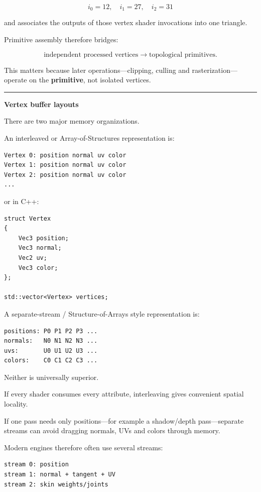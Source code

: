 \[
i_0=12,\quad i_1=27,\quad i_2=31
\]

and associates the outputs of those vertex shader invocations into one triangle.

Primitive assembly therefore bridges:

\[
\text{independent processed vertices}
\rightarrow
\text{topological primitives}.
\]

This matters because later operations---clipping, culling and rasterization---operate on the \textbf{primitive}, not isolated vertices.

\begin{center}\rule{0.5\linewidth}{0.5pt}\end{center}

\textbf{Vertex buffer layouts}

There are two major memory organizations.

An interleaved or Array-of-Structures representation is:

\begin{verbatim}
Vertex 0: position normal uv color
Vertex 1: position normal uv color
Vertex 2: position normal uv color
...
\end{verbatim}

or in C++:

\begin{verbatim}
struct Vertex
{
    Vec3 position;
    Vec3 normal;
    Vec2 uv;
    Vec3 color;
};

std::vector<Vertex> vertices;
\end{verbatim}

A separate-stream / Structure-of-Arrays style representation is:

\begin{verbatim}
positions: P0 P1 P2 P3 ...
normals:   N0 N1 N2 N3 ...
uvs:       U0 U1 U2 U3 ...
colors:    C0 C1 C2 C3 ...
\end{verbatim}

Neither is universally superior.

If every shader consumes every attribute, interleaving gives convenient spatial locality.

If one pass needs only positions---for example a shadow/depth pass---separate streams can avoid dragging normals, UVs and colors through memory.

Modern engines therefore often use several streams:

\begin{verbatim}
stream 0: position
stream 1: normal + tangent + UV
stream 2: skin weights/joints
\end{verbatim}

